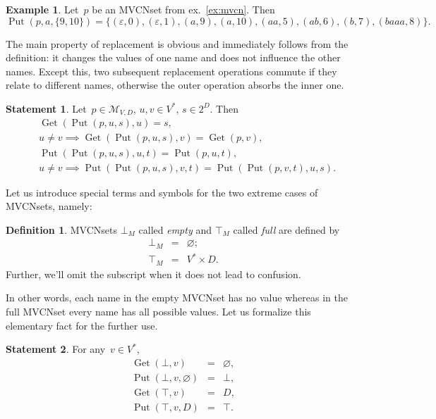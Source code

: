 \documentclass{article}
\theoremstyle{definition}
\newtheorem{Df}{Definition}
\newtheorem{St}{Statement}
\newtheorem{Ex}{Example}
\newcommand{\setcharmvcn}{M}
\newcommand{\setsymbol}[3]{\mathcal{#1}_{#2,#3}}
\newcommand{\setmvcn}[2]{\setsymbol{\setcharmvcn}{#1}{#2}}
\newcommand{\deref}{\operatorname{Get}}
\newcommand{\putval}{\operatorname{Put}}
\begin{document}
\begin{Ex}\label{ex:mvcn-replace}
Let~$p$ be an MVCNset from ex.~\ref{ex:mvcn}. Then
\[
  \putval(p, a, \{ 9, 10 \}) = \{
    (\varepsilon, 0),
    (\varepsilon, 1),
    (a,           9),
    (a,           10),
    (aa,          5),
    (ab,          6),
    (b,           7),
    (baaa,        8)
  \} .
\]
\end{Ex}

The main property of replacement is obvious and immediately follows from the
definition: it changes the values of one name and does not influence the other
names. Except this, two subsequent replacement operations commute if they
relate to different names, otherwise the outer operation absorbs the inner one.
\begin{St}\label{st:mvcn-replace-deref}
Let~$p \in \setmvcn{V}{D}$, $u, v \in V^\ast$, $s \in 2^D$. Then
\begin{eqnarray*}
  & \deref(\putval(p, u, s), u) = s , \\
  & u \neq v \implies \deref(\putval(p, u, s), v) = \deref(p, v) , \\
  & \putval(\putval(p, u, s), u, t) = \putval(p, u, t) , \\
  & u \neq v \implies \putval(\putval(p, u, s), v, t) = \putval(\putval(p, v, t), u, s) .
\end{eqnarray*}
\end{St}

Let us introduce special terms and symbols for the two extreme cases of
MVCNsets, namely:
\begin{Df}\label{df:mvcn-extremes}
MVCNsets $\bot_\setcharmvcn$ called \emph{empty} and $\top_\setcharmvcn$ called
\emph{full} are defined by
\begin{eqnarray*}
  \bot_\setcharmvcn &  = &  \varnothing ; \\
  \top_\setcharmvcn &  = &  V^\ast \times D .
\end{eqnarray*}
Further, we'll omit the subscript when it does not lead to confusion.
\end{Df}

In other words, each name in the empty MVCNset has no value whereas in the
full MVCNset every name has all possible values. Let us formalize this
elementary fact for the further use.
\begin{St}\label{st:mvcn-extreme-deref}
For any~$v\in V^\ast$,
\begin{eqnarray*}
  \deref(\bot, v) & = & \varnothing, \\
  \putval(\bot, v, \varnothing) & = & \bot , \\
  \deref(\top, v) & = & D , \\
  \putval(\top, v, D) & = & \top .
\end{eqnarray*}
\end{St}
\end{document}
